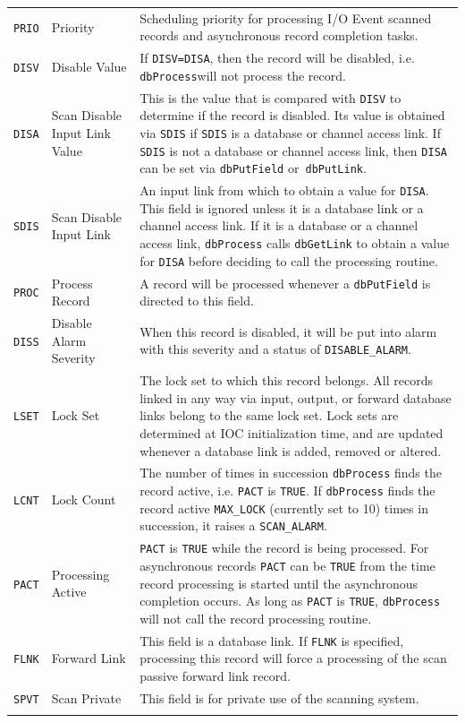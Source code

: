 \documentclass[11pt
  , a4paper
  , article
  , oneside
]{memoir}
\begin{document}
\begin{center}
\begin{longtable}[!hbt]{>{\raggedleft\arraybackslash}p{1cm} |p{3.3cm}| p{9cm}}
\texttt{PRIO}    & Priority & Scheduling priority for processing I/O Event scanned records and asynchronous record completion tasks.\\
\texttt{DISV}    & Disable Value & If \texttt{DISV=DISA}, then the record will be disabled, i.e. \texttt{dbProcess}will not process the record.\\
\texttt{DISA}    & Scan Disable Input Link Value & This is the value that is compared with \texttt{DISV} to determine if the record is disabled. Its value is obtained via \texttt{SDIS} if \texttt{SDIS} is a database or channel access link. If \texttt{SDIS} is not a database or channel access link, then \texttt{DISA} can be set via \texttt{dbPutField} or\texttt{ dbPutLink}.\\
\texttt{SDIS}    & Scan Disable Input Link & An input link from which to obtain a value for \texttt{DISA}. This field is ignored unless it is a database link or a channel access link. If it is a database or a channel access link, \texttt{dbProcess} calls \texttt{dbGetLink} to obtain a value for \texttt{DISA} before deciding to call the processing routine.\\
\texttt{PROC}    & Process Record & A record will be processed whenever a \texttt{dbPutField} is directed to this field.\\
\texttt{DISS}    & Disable Alarm Severity & When this record is disabled, it will be put into alarm with this severity and a status of \texttt{DISABLE\_ALARM}.\\
\texttt{LSET}    & Lock Set & The lock set to which this record belongs. All records linked in any way via input, output, or forward database links belong to the same lock set. Lock sets are determined at IOC initialization time, and are updated whenever a database link is added, removed or altered.\\
\texttt{LCNT}    & Lock Count & The number of times in succession \texttt{dbProcess} finds the record active, i.e. \texttt{PACT} is \texttt{TRUE}. If \texttt{dbProcess} finds the record active \texttt{MAX\_LOCK} (currently set to 10) times in succession, it raises a \texttt{SCAN\_ALARM}. \\
\texttt{PACT}    & Processing Active &  \texttt{PACT} is \texttt{TRUE} while the record is being processed. For asynchronous records \texttt{PACT} can be \texttt{TRUE} from the time record processing is started until the asynchronous completion occurs. As long as \texttt{PACT} is \texttt{TRUE}, \texttt{dbProcess} will not call the record processing routine.\\
\texttt{FLNK}    & Forward Link & This field is a database link. If \texttt{FLNK} is specified, processing this record will force a processing of the scan passive forward link record.\\
\texttt{SPVT}    & Scan Private & This field is for private use of the scanning system.\\
&\\
\end{longtable}
\end{center}
\end{document}
